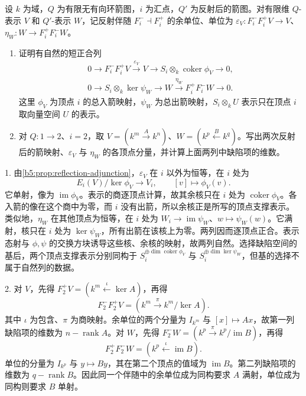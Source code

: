 \begin{optionalexercise}\label{b5:ex:10-reflection-adjunction}
	设 \(k\) 为域，\(Q\) 为有限无有向环箭图，\(i\) 为汇点，\(Q'\) 为反射后的箭图。对有限维 \(Q\)-表示 \(V\) 和 \(Q'\)-表示 \(W\)，记反射伴随 \(F_i^-\dashv F_i^+\) 的余单位、单位为 \(\varepsilon_V:F_i^-F_i^+V\to V\)、\(\eta_W:W\to F_i^+F_i^-W\)。
	\begin{enumerate}
		\item 证明有自然的短正合列
			\[
				\begin{gathered}
					0\longrightarrow F_i^-F_i^+V\xrightarrow{\varepsilon_V}V \longrightarrow S_i\otimes_k\operatorname{coker}\phi_V\longrightarrow0,\\
					0\longrightarrow S_i\otimes_k\ker\psi_W\longrightarrow W \xrightarrow{\eta_W}F_i^+F_i^-W\longrightarrow0.
				\end{gathered}
			\]
			这里 \(\phi_V\) 为顶点 \(i\) 的总入箭映射，\(\psi_W\) 为总出箭映射，\(S_i\otimes_k U\) 表示只在顶点 \(i\) 取向量空间 \(U\) 的表示。
		\item 对 \(Q:1\to2\)、\(i=2\)，取 \(V=(k^m\xrightarrow{A}k^n)\)、\(W=(k^p\xleftarrow{B}k^q)\)。写出两次反射后的箭映射、\(\varepsilon_V\) 与 \(\eta_W\) 的各顶点分量，并计算上面两列中缺陷项的维数。
	\end{enumerate}
\end{optionalexercise}
\begin{solution}
	1. 由\cref{b5:prop:reflection-adjunction}，\(\varepsilon_V\) 在 \(i\) 以外为恒等，在 \(i\) 处为
	\[
		E_i(V)/\ker\phi_V\longrightarrow V_i, \qquad [v]\longmapsto\phi_V(v).
	\]
	它单射，像为 \(\operatorname{im}\phi_V\)。表示的商逐顶点计算，故其余核只在 \(i\) 处为 \(\operatorname{coker}\phi_V\)。各入箭的像在这个商中为零，而 \(i\) 没有出箭，所以余核正是所写的顶点支撑表示。类似地，\(\eta_W\) 在其他顶点为恒等，在 \(i\) 处为 \(W_i\to\operatorname{im}\psi_W\)、\(w\mapsto\psi_W(w)\)。它满射，核只在 \(i\) 处为 \(\ker\psi_W\)，所有出箭在该核上为零。两列因而逐顶点正合。表示态射与 \(\phi,\psi\) 的交换方块诱导这些核、余核的映射，故两列自然。选择缺陷空间的基后，两个顶点支撑表示分别同构于 \(S_i^{\oplus\dim\operatorname{coker}\phi_V}\) 与 \(S_i^{\oplus\dim\ker\psi_W}\)，但基的选择不属于自然列的数据。

	2. 对 \(V\)，先得 \(F_2^+V=(k^m\xleftarrow{\iota}\ker A)\)，再得
	\[
		F_2^-F_2^+V=(k^m\xrightarrow{\pi}k^m/\ker A).
	\]
	其中 \(\iota\) 为包含、\(\pi\) 为商映射。余单位的两个分量为 \(I_{k^m}\) 与 \([x]\mapsto Ax\)，故第一列缺陷项的维数为 \(n-\operatorname{rank}A\)。对 \(W\)，先得 \(F_2^-W=(k^p\xrightarrow{\pi}k^p/\operatorname{im}B)\)，再得
	\[
		F_2^+F_2^-W=(k^p\xleftarrow{\iota}\operatorname{im}B).
	\]
	单位的分量为 \(I_{k^p}\) 与 \(y\mapsto By\)，其在第二个顶点的值域为 \(\operatorname{im}B\)。第二列缺陷项的维数为 \(q-\operatorname{rank}B\)。因此同一个伴随中的余单位成为同构要求 \(A\) 满射，单位成为同构则要求 \(B\) 单射。
\end{solution}

